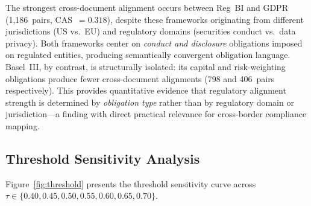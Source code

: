 \documentclass{article}
\begin{document}
The strongest cross-document alignment occurs between Reg~BI and GDPR
(1,186~pairs, CAS~$=0.318$), despite these frameworks originating from
different jurisdictions (US vs.\ EU) and regulatory domains (securities
conduct vs.\ data privacy).
Both frameworks center on \textit{conduct and disclosure} obligations
imposed on regulated entities, producing semantically convergent
obligation language.
Basel~III, by contrast, is structurally isolated: its capital and
risk-weighting obligations produce fewer cross-document alignments
(798 and 406~pairs respectively).
This provides quantitative evidence that regulatory alignment strength
is determined by \textit{obligation type} rather than by regulatory
domain or jurisdiction---a finding with direct practical relevance for
cross-border compliance mapping.

\subsection{Threshold Sensitivity Analysis}

Figure~\ref{fig:threshold} presents the threshold sensitivity curve
across $\tau \in \{0.40, 0.45, 0.50, 0.55, 0.60, 0.65, 0.70\}$.
\end{document}
